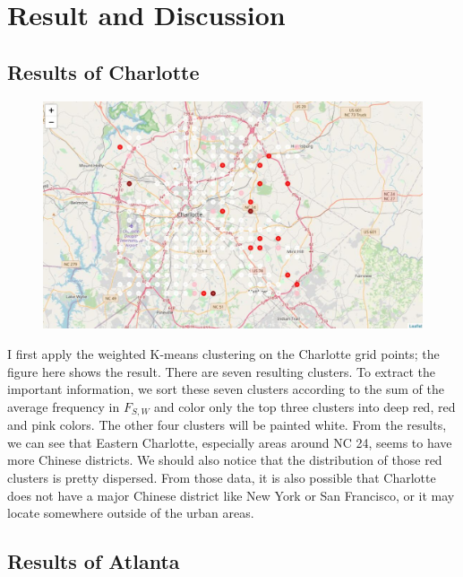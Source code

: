 \documentclass{article}
\begin{document}
\section{Result and Discussion}

\subsection{Results of Charlotte}

\begin{figure}[h!]
\includegraphics[width=1.0\textwidth]{cn4.jpg}
\centering
\end{figure}

I first apply the weighted K-means clustering on the Charlotte grid points; the figure here shows the result.
There are seven resulting clusters.
To extract the important information, we sort these seven clusters according to the sum of the average frequency in $F_{S, W}$ and color only the top three clusters into deep red, red and pink colors.
The other four clusters will be painted white.
From the results, we can see that Eastern Charlotte, especially areas around NC 24, seems to have more Chinese districts.
We should also notice that the distribution of those red clusters is pretty dispersed.
From those data, it is also possible that Charlotte does not have a major Chinese district like New York or San Francisco, or it may locate somewhere outside of the urban areas.

\subsection{Results of Atlanta}
\end{document}
